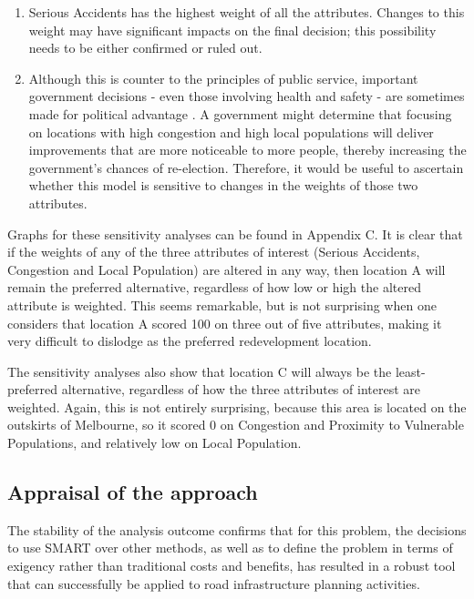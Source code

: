 \documentclass[11pt, a4paper]{article}
\begin{document}
    \begin{enumerate}
        \item Serious Accidents has the highest weight of all the attributes. Changes to this weight may have significant impacts on the final decision; this possibility needs to be either confirmed or ruled out.
        \item Although this is counter to the principles of public service, important government decisions - even those involving health and safety - are sometimes made for political advantage \parencite{a19}. A government might determine that focusing on locations with high congestion and high local populations will deliver improvements that are more noticeable to more people, thereby increasing the government's chances of re-election. Therefore, it would be useful to ascertain whether this model is sensitive to changes in the weights of those two attributes.
    \end{enumerate}

    Graphs for these sensitivity analyses can be found in Appendix C. It is clear that if the weights of any of the three attributes of interest (Serious Accidents, Congestion and Local Population) are altered in any way, then location A will remain the preferred alternative, regardless of how low or high the altered attribute is weighted. This seems remarkable, but is not surprising when one considers that location A scored 100 on three out of five attributes, making it very difficult to dislodge as the preferred redevelopment location. 

    The sensitivity analyses also show that location C will always be the least-preferred alternative, regardless of how the three attributes of interest are weighted. Again, this is not entirely surprising, because this area is located on the outskirts of Melbourne, so it scored 0 on Congestion and Proximity to Vulnerable Populations, and relatively low on Local Population.

    \subsection{Appraisal of the approach}

    The stability of the analysis outcome confirms that for this problem, the decisions to use SMART over other methods, as well as to define the problem in terms of exigency rather than traditional costs and benefits, has resulted in a robust tool that can successfully be applied to road infrastructure planning activities.
\end{document}
